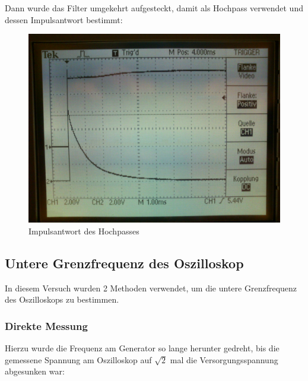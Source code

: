 Dann wurde das Filter umgekehrt aufgesteckt, damit als Hochpass verwendet und dessen Impulsantwort bestimmt:
\begin{figure}[H]
	\centering
	\includegraphics[width=\linewidth]{versuch3/oszi/DSC_0287.JPG}
	\caption{Impulsantwort des Hochpasses}
\end{figure}

\subsection{Untere Grenzfrequenz des Oszilloskop}
In diesem Versuch wurden 2 Methoden verwendet, um die untere Grenzfrequenz des Oszilloskops zu bestimmen.
\subsubsection*{Direkte Messung}
Hierzu wurde die Frequenz am Generator so lange herunter gedreht, bis die gemessene Spannung am Oszilloskop auf $\sqrt{2}$ mal die Versorgungsspannung abgesunken war:

